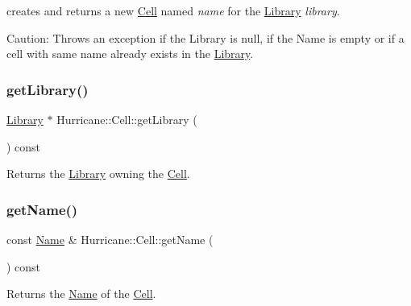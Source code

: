 creates and returns a new \mbox{\hyperlink{classHurricane_1_1Cell}{Cell}} named {\itshape name} for the \mbox{\hyperlink{classHurricane_1_1Library}{Library}} {\itshape library}.

\begin{DoxyParagraph}{Caution\+: Throws an exception if the Library is null, if the Name is}
empty or if a cell with same name already exists in the \mbox{\hyperlink{classHurricane_1_1Library}{Library}}. 
\end{DoxyParagraph}
\mbox{\label{classHurricane_1_1Cell_aa84b97773160a28d3dd69df1e261eecf}} 
\subsubsection{\texorpdfstring{get\+Library()}{getLibrary()}}
{\footnotesize\ttfamily \mbox{\hyperlink{classHurricane_1_1Library}{Library}} $\ast$ Hurricane\+::\+Cell\+::get\+Library (\begin{DoxyParamCaption}{ }\end{DoxyParamCaption}) const\hspace{0.3cm}{\ttfamily [inline]}}

Returns the \mbox{\hyperlink{classHurricane_1_1Library}{Library}} owning the \mbox{\hyperlink{classHurricane_1_1Cell}{Cell}}. \mbox{\label{classHurricane_1_1Cell_a01cd4bba972d484496fd297648b8fa0c}} 
\subsubsection{\texorpdfstring{get\+Name()}{getName()}}
{\footnotesize\ttfamily const \mbox{\hyperlink{classHurricane_1_1Name}{Name}} \& Hurricane\+::\+Cell\+::get\+Name (\begin{DoxyParamCaption}{ }\end{DoxyParamCaption}) const\hspace{0.3cm}{\ttfamily [inline]}}

Returns the \mbox{\hyperlink{classHurricane_1_1Name}{Name}} of the \mbox{\hyperlink{classHurricane_1_1Cell}{Cell}}. \mbox{\label{classHurricane_1_1Cell_abaf178b24734de37cf0ac31918c096ac}} 
